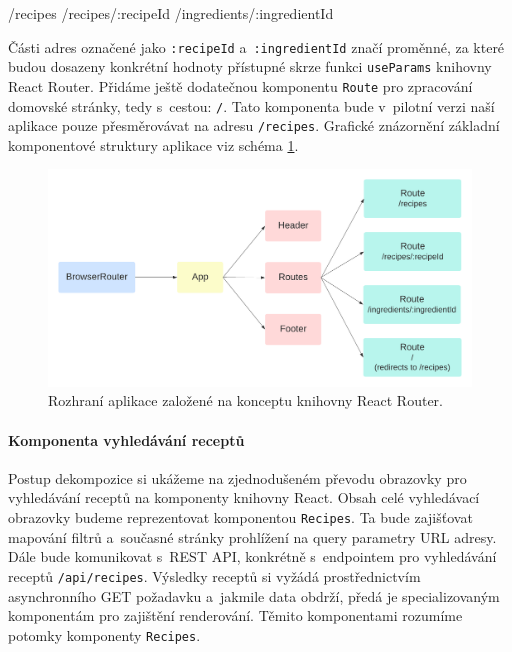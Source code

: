 \begin{code}
/recipes
/recipes/:recipeId
/ingredients/:ingredientId
\end{code}

Části adres označené jako \texttt{:recipeId} a~\texttt{:ingredientId} značí proměnné, za které budou dosazeny konkrétní hodnoty přístupné skrze funkci \texttt{useParams} kni\-hovny React Router. Přidáme ještě dodatečnou komponentu \texttt{Route} pro zpracování domovské stránky, tedy s~cestou: \texttt{/}. Tato komponenta bude v~pilotní verzi naší aplikace pouze přesměrovávat na adresu \texttt{/recipes}. Grafické znázornění základní komponentové struktury aplikace viz schéma \ref{obr02:react-app}.

\begin{figure}[h!]\centering
\includegraphics[width=140mm]{../img/react-app}
\caption{Rozhraní aplikace založené na konceptu knihovny React Router.}
\label{obr02:react-app}
\end{figure}

\paragraph{Komponenta vyhledávání receptů}

Postup dekompozice si ukážeme na zjednodušeném převodu obrazovky pro vyhledávání receptů na komponenty knihovny React. Obsah celé vyhledávací obrazovky budeme reprezentovat komponentou \texttt{Recipes}. Ta bude zajišťovat mapování filtrů a~současné stránky prohlížení na query parametry URL adresy. Dále bude komunikovat s~REST API, konkrétně s~endpointem pro vyhledávání receptů \texttt{/api/recipes}. Výsledky receptů si vyžádá prostřednictvím asynchronního GET požadavku a~jakmile data obdrží, předá je specializovaným komponentám pro zajištění renderování. Těmito komponentami rozumíme potomky komponenty \texttt{Recipes}.

